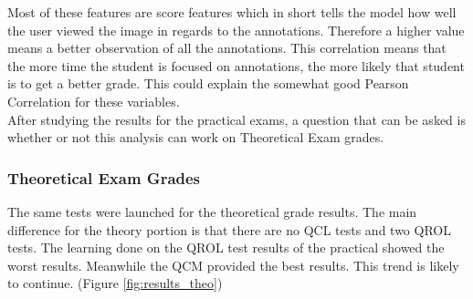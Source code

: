 \documentclass[a4paper,11pt]{report}
\numberwithin{figure}{section} %
\begin{document}
   Most of these features are score features which in short tells the model how well the user viewed the image in regards to the annotations.
   Therefore a higher value means a better observation of all the annotations.
   This correlation means that the more time the student is focused on annotations, the more likely that student is to get a better grade.
   This could explain the somewhat good Pearson Correlation for these variables.\\
   
   After studying the results for the practical exams, a question that can be asked is whether or not this analysis can work on Theoretical Exam grades.
    
    \subsubsection{Theoretical Exam Grades}
        
        The same tests were launched for the theoretical grade results.
        The main difference for the theory portion is that there are no QCL tests and two QROL tests.
        The learning done on the QROL test results of the practical showed the worst results.
        Meanwhile the QCM provided the best results.
        This trend is likely to continue. (Figure \ref{fig:results_theo})
        
\end{document}
